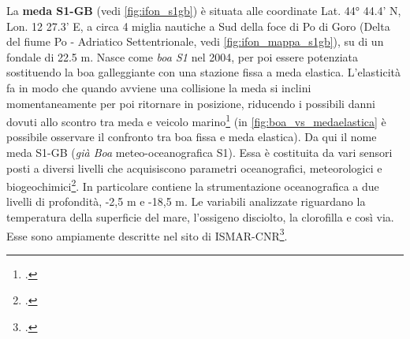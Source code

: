 \documentclass[./main.tex]{subfiles}
\begin{document}
La \textbf{meda S1-GB} (vedi \autoref{fig:ifon_s1gb}) è situata alle coordinate Lat. 44° 44.4' N, Lon. 12 27.3' E, a circa 4 miglia nautiche a Sud della foce di Po di Goro (Delta del fiume Po - Adriatico Settentrionale, vedi \autoref{fig:ifon_mappa_s1gb}), su di un fondale di 22.5 m. Nasce come \textit{boa S1} nel 2004, per poi essere potenziata sostituendo la boa galleggiante con una stazione fissa a meda elastica. L'elasticità fa in modo che quando avviene una collisione la meda si inclini momentaneamente per poi ritornare in posizione, riducendo i possibili danni dovuti allo scontro tra meda e veicolo marino\footcite[1-4]{resinex-meda-elastica} (in \autoref{fig:boa_vs_medaelastica} è possibile osservare il confronto tra boa fissa e meda elastica). Da qui il nome meda S1-GB (\textit{già Boa} meteo-oceanografica S1). Essa è costituita da vari sensori posti a diversi livelli che acquisiscono parametri oceanografici, meteorologici e biogeochimici\footcite[13-15]{rete-ifon}. In particolare contiene la strumentazione oceanografica a due livelli di profondità, -2,5 m e -18,5 m. Le variabili analizzate riguardano la temperatura della superficie del mare, l'ossigeno disciolto, la clorofilla e così via. Esse sono ampiamente descritte nel sito di ISMAR-CNR\footcite[Fonte: ][\url{https://www.ismar.cnr.it/infrastrutture/infrastrutture-oceanografiche/meda-s1-gb/}]{website-ismar-cnr}.\par
\end{document}
